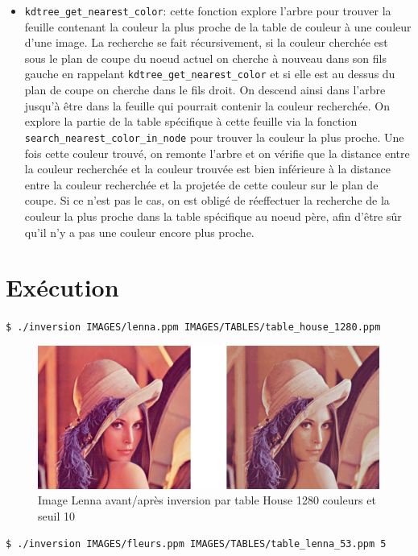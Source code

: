 \documentclass[a4paper,11pt,final]{article}
\begin{document}
\begin{itemize}
\item\texttt{kdtree\_get\_nearest\_color}: cette fonction explore l’arbre pour trouver la feuille contenant la couleur la plus proche de la table de couleur à une couleur d’une image. La recherche se fait récursivement, si la couleur cherchée est sous le plan de coupe du noeud actuel on cherche à nouveau dans son fils gauche en rappelant \texttt{kdtree\_get\_nearest\_color} et si elle est au dessus du plan de coupe on cherche dans le fils droit. On descend ainsi dans l’arbre jusqu’à être dans la feuille qui pourrait contenir la couleur recherchée. On explore la partie de la table spécifique à cette feuille via la fonction \texttt{search\_nearest\_color\_in\_node} pour trouver la couleur la plus proche. Une fois cette couleur trouvé, on remonte l’arbre et on vérifie que la distance entre la couleur recherchée et la couleur trouvée est bien inférieure à la distance entre la couleur recherchée et la projetée de cette couleur sur le plan de coupe. Si ce n’est pas le cas, on est obligé de réeffectuer la recherche de la couleur la plus proche dans la table spécifique au noeud père, afin d’être sûr qu’il n’y a pas une couleur encore plus proche.
\end{itemize}

\section{Exécution}

\texttt{\$ ./inversion IMAGES/lenna.ppm IMAGES/TABLES/table\_house\_1280.ppm}

\begin{figure}[!ht]
    \centering
    \includegraphics[width=150mm]{./pic/beforeAfter1280.jpg}
    \caption{Image Lenna avant/après inversion par table House 1280 couleurs et seuil 10}
\end{figure}

\cleardoublepage

\texttt{\$ ./inversion IMAGES/fleurs.ppm IMAGES/TABLES/table\_lenna\_53.ppm 5}
\end{document}
